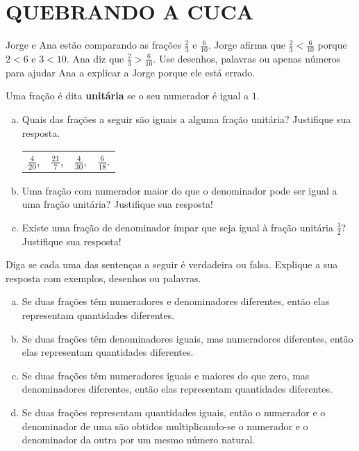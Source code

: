 \section{QUEBRANDO A CUCA }

\begin{atividade}{}

Jorge e Ana estão comparando as frações $\frac{2}{3}$ e $\frac{6}{10}$. Jorge afirma que
$\frac{2}{3} < \frac{6}{10}$ porque $2 < 6$ e $3 < 10$. Ana diz que $\frac{2}{3} > \frac{6}{10}$. Use desenhos, palavras ou apenas números para ajudar Ana a explicar a Jorge porque ele está errado.
\end{atividade}


\begin{atividade}{}

Uma fração é dita {\bf unitária} se o seu numerador é igual a $1$.
\begin{enumerate}[a)]
\item  Quais das frações a seguir são iguais a alguma fração unitária? Justifique sua resposta.

\begin{center}
\begin{tabular}{m{}m{}m{}m{}}
$\frac{4}{20}$, & $\frac{21}{7}$, & $\frac{4}{30}$, & $\frac{6}{18}$.
\end{tabular}
\end{center}

\item  Uma fração com numerador maior do que o denominador pode ser igual a uma fração unitária? Justifique sua resposta!

\item  Existe uma fração de denominador ímpar que seja igual à fração unitária $\frac{1}{2}$? Justifique sua resposta!
\end{enumerate}
\end{atividade}

\begin{atividade}{}

Diga se cada uma das sentenças a seguir é verdadeira ou falsa. Explique a sua resposta com exemplos, desenhos ou palavras.
\begin{enumerate}[a)]
 \item  Se duas frações têm numeradores e denominadores diferentes, então elas representam quantidades diferentes.
 \item Se duas frações têm denominadores iguais, mas numeradores diferentes, então elas representam quantidades diferentes.
 \item Se duas frações têm numeradores iguais e maiores do que zero, mas denominadores diferentes, então elas representam quantidades diferentes.
 \item Se duas frações representam quantidades iguais, então o numerador e o denominador de uma são obtidos multiplicando-se o numerador e o denominador da outra por um mesmo número natural.
\end{enumerate}
\end{atividade}

